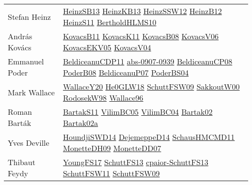 {\begin{longtable}{p{4cm}p{20cm}}
Stefan Heinz & \href{articles/HeinzSB13.pdf}{HeinzSB13}\cite{HeinzSB13} \href{papers/HeinzKB13.pdf}{HeinzKB13}\cite{HeinzKB13} \href{articles/HeinzSSW12.pdf}{HeinzSSW12}\cite{HeinzSSW12} \href{papers/HeinzB12.pdf}{HeinzB12}\cite{HeinzB12} \href{papers/HeinzS11.pdf}{HeinzS11}\cite{HeinzS11} \href{papers/BertholdHLMS10.pdf}{BertholdHLMS10}\cite{BertholdHLMS10} \\
Andr{\'{a}}s Kov{\'{a}}cs & \href{articles/KovacsB11.pdf}{KovacsB11}\cite{KovacsB11} \href{articles/KovacsK11.pdf}{KovacsK11}\cite{KovacsK11} \href{articles/KovacsB08.pdf}{KovacsB08}\cite{KovacsB08} \href{papers/KovacsV06.pdf}{KovacsV06}\cite{KovacsV06} \href{papers/KovacsEKV05.pdf}{KovacsEKV05}\cite{KovacsEKV05} \href{papers/KovacsV04.pdf}{KovacsV04}\cite{KovacsV04} \\
Emmanuel Poder & \href{articles/BeldiceanuCDP11.pdf}{BeldiceanuCDP11}\cite{BeldiceanuCDP11} \href{articles/abs-0907-0939.pdf}{abs-0907-0939}\cite{abs-0907-0939} \href{papers/BeldiceanuCP08.pdf}{BeldiceanuCP08}\cite{BeldiceanuCP08} \href{papers/PoderB08.pdf}{PoderB08}\cite{PoderB08} \href{papers/BeldiceanuP07.pdf}{BeldiceanuP07}\cite{BeldiceanuP07} \href{articles/PoderBS04.pdf}{PoderBS04}\cite{PoderBS04} \\
Mark Wallace & \href{articles/WallaceY20.pdf}{WallaceY20}\cite{WallaceY20} \href{papers/He0GLW18.pdf}{He0GLW18}\cite{He0GLW18} \href{papers/SchuttFSW09.pdf}{SchuttFSW09}\cite{SchuttFSW09} \href{articles/SakkoutW00.pdf}{SakkoutW00}\cite{SakkoutW00} \href{papers/RodosekW98.pdf}{RodosekW98}\cite{RodosekW98} \href{articles/Wallace96.pdf}{Wallace96}\cite{Wallace96} \\
Roman Bart{\'{a}}k & \href{articles/BartakS11.pdf}{BartakS11}\cite{BartakS11} \href{articles/VilimBC05.pdf}{VilimBC05}\cite{VilimBC05} \href{papers/VilimBC04.pdf}{VilimBC04}\cite{VilimBC04} \href{papers/Bartak02.pdf}{Bartak02}\cite{Bartak02} \href{papers/Bartak02a.pdf}{Bartak02a}\cite{Bartak02a} \\
Yves Deville & \href{papers/HoundjiSWD14.pdf}{HoundjiSWD14}\cite{HoundjiSWD14} \href{papers/DejemeppeD14.pdf}{DejemeppeD14}\cite{DejemeppeD14} \href{articles/SchausHMCMD11.pdf}{SchausHMCMD11}\cite{SchausHMCMD11} \href{papers/MonetteDH09.pdf}{MonetteDH09}\cite{MonetteDH09} \href{papers/MonetteDD07.pdf}{MonetteDD07}\cite{MonetteDD07} \\
Thibaut Feydy & \href{papers/YoungFS17.pdf}{YoungFS17}\cite{YoungFS17} \href{papers/SchuttFS13.pdf}{SchuttFS13}\cite{SchuttFS13} \href{papers/cpaior-SchuttFS13.pdf}{cpaior-SchuttFS13}\cite{cpaior-SchuttFS13} \href{articles/SchuttFSW11.pdf}{SchuttFSW11}\cite{SchuttFSW11} \href{papers/SchuttFSW09.pdf}{SchuttFSW09}\cite{SchuttFSW09} \\

\end{longtable}}
